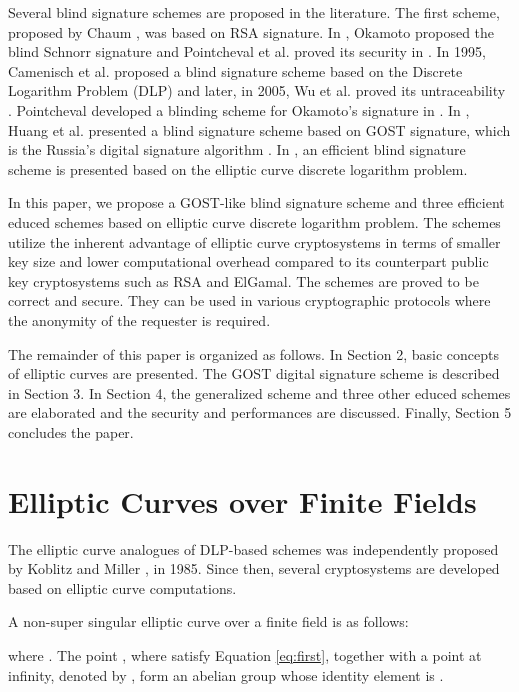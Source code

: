 \documentclass[journal,onecolumn,draftcls]{IEEEtran}
\begin{document}
Several blind signature schemes are proposed in the literature. The first scheme, proposed by Chaum \cite{Chaum82}, was based on RSA signature. In \cite{Okamoto}, Okamoto proposed the blind Schnorr signature and Pointcheval et al. proved its security in \cite{Pointcheval}. In 1995, Camenisch et al. proposed a blind signature scheme based on the Discrete Logarithm Problem (DLP) \cite{Camenisch} and later, in 2005, Wu et al. proved its untraceability \cite{Ting}. Pointcheval developed a blinding scheme for Okamoto's signature in \cite{Pointcheval2}. In \cite{Huang}, Huang et al. presented a blind signature scheme based on GOST signature, which is the Russia's digital signature algorithm \cite{Michels}. In \cite{Nikooghadam}, an efficient blind signature scheme is presented based on the elliptic curve discrete logarithm problem.

In this paper, we propose a GOST-like blind signature scheme and three efficient educed schemes based on elliptic curve discrete logarithm problem. The schemes utilize the inherent advantage of elliptic curve cryptosystems in terms of smaller key size and lower computational overhead compared to its counterpart public key cryptosystems such as RSA and ElGamal. The schemes are proved to be correct and secure. They can be used in various cryptographic protocols where the anonymity of the requester is required.

The remainder of this paper is organized as follows. In Section 2, basic concepts of elliptic curves are presented. The GOST digital signature scheme is described in Section 3. In Section 4, the generalized scheme and three other educed schemes are elaborated and the security and performances are discussed. Finally, Section 5 concludes the paper.

\section{Elliptic Curves over Finite Fields}
The elliptic curve analogues of DLP-based schemes was independently proposed by Koblitz \cite{Koblitz} and Miller \cite{Miller}, in 1985. Since then, several cryptosystems are developed based on elliptic curve computations.

A non-super singular elliptic curve  over a finite field  is as follows:

where . The point , where  satisfy Equation \ref{eq:first}, together with a point at infinity, denoted by , form an abelian group  whose identity element is . 
\end{document}
